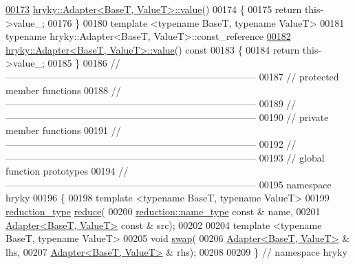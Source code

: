 \begin{DoxyCode}
\hypertarget{adapter_8h_source_l00173}{}\hyperlink{classhryky_1_1_adapter_ab736ecd30f215ca3cbd2364f818cb83f}{00173} \hyperlink{classhryky_1_1_adapter}{hryky::Adapter<BaseT, ValueT>::value}()
00174 \{
00175     \textcolor{keywordflow}{return} this->value\_;
00176 \}
00180 \textcolor{keyword}{template} <\textcolor{keyword}{typename} BaseT, \textcolor{keyword}{typename} ValueT>
00181 \textcolor{keyword}{typename} hryky::Adapter<BaseT, ValueT>::const\_reference 
\hypertarget{adapter_8h_source_l00182}{}\hyperlink{classhryky_1_1_adapter_a5856f2ee6c0622e153f52fbb6ca6bbe9}{00182} \hyperlink{classhryky_1_1_adapter}{hryky::Adapter<BaseT, ValueT>::value}()\textcolor{keyword}{ const}
00183 \textcolor{keyword}{}\{
00184     \textcolor{keywordflow}{return} this->value\_;
00185 \}
00186 \textcolor{comment}{//
      ------------------------------------------------------------------------------}
00187 \textcolor{comment}{// protected member functions}
00188 \textcolor{comment}{//
      ------------------------------------------------------------------------------}
00189 \textcolor{comment}{//
      ------------------------------------------------------------------------------}
00190 \textcolor{comment}{// private member functions}
00191 \textcolor{comment}{//
      ------------------------------------------------------------------------------}
00192 \textcolor{comment}{//
      ------------------------------------------------------------------------------}
00193 \textcolor{comment}{// global function prototypes}
00194 \textcolor{comment}{//
      ------------------------------------------------------------------------------}
00195 \textcolor{keyword}{namespace }hryky
00196 \{
00198     \textcolor{keyword}{template} <\textcolor{keyword}{typename} BaseT, \textcolor{keyword}{typename} ValueT>
00199     \hyperlink{classhryky_1_1_intrusive_ptr}{reduction_type} \hyperlink{namespacehryky_af41cb3af6766761da0ff21b84527a52c}{reduce}(
00200         \hyperlink{classhryky_1_1reduction_1_1_string}{reduction::name_type} \textcolor{keyword}{const} & name,
00201         \hyperlink{classhryky_1_1_adapter}{Adapter<BaseT, ValueT>} \textcolor{keyword}{const} & src);
00202 
00204     \textcolor{keyword}{template} <\textcolor{keyword}{typename} BaseT, \textcolor{keyword}{typename} ValueT>
00205     \textcolor{keywordtype}{void} \hyperlink{namespacehryky_a4282146df5ea2b68cb667896a2205909}{swap}(
00206         \hyperlink{classhryky_1_1_adapter}{Adapter<BaseT, ValueT>} & lhs,
00207         \hyperlink{classhryky_1_1_adapter}{Adapter<BaseT, ValueT>} & rhs);
00208 
00209 \} \textcolor{comment}{// namespace hryky}

\end{DoxyCode}
